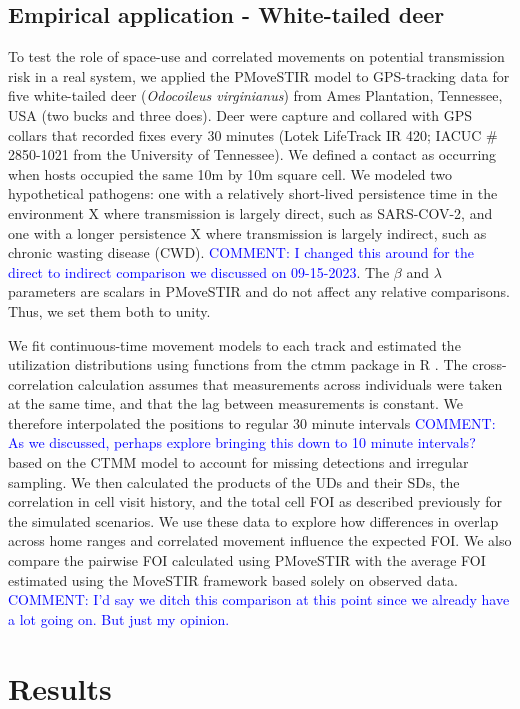 \documentclass[letterpaper]{article}
\begin{document}
\subsection*{Empirical application - White-tailed deer}

To test the role of space-use and correlated movements on potential transmission risk in a real system, we applied the PMoveSTIR model to GPS-tracking data for five white-tailed deer (\emph{Odocoileus virginianus}) from Ames Plantation, Tennessee, USA (two bucks and three does).  Deer were capture and collared with GPS collars that recorded fixes every 30 minutes (Lotek LifeTrack IR 420; IACUC \# 2850-1021 from the University of Tennessee).  We defined a contact as occurring when hosts occupied the same 10m by 10m square cell. We modeled two hypothetical pathogens: one with a relatively short-lived persistence time in the environment X where transmission is largely direct, such as SARS-COV-2, and one with a longer persistence X where transmission is largely indirect, such as chronic wasting disease (CWD). \textcolor{blue}{COMMENT:  I changed this around for the direct to indirect comparison we discussed on 09-15-2023}.  The $\beta$ and $\lambda$ parameters are scalars in PMoveSTIR and do not affect any relative comparisons. Thus, we set them both to unity. 

We fit continuous-time movement models to each track and estimated the utilization distributions using functions from the ctmm package in R \citep{Calabrese2016}. The cross-correlation calculation assumes that measurements across individuals were taken at the same time, and that the lag between measurements is constant. We therefore interpolated the positions to regular 30 minute intervals \textcolor{blue}{COMMENT: As we discussed, perhaps explore bringing this down to 10 minute intervals?} based on the CTMM model to account for missing detections and irregular sampling. 
We then calculated the products of the UDs and their SDs, the correlation in cell visit history, and the total cell FOI as described previously for the simulated scenarios. 
We use these data to explore how differences in overlap across home ranges and  correlated movement influence the expected FOI. 
We also compare the pairwise FOI calculated using PMoveSTIR with the average FOI estimated using the MoveSTIR framework based solely on observed data. \textcolor{blue}{COMMENT: I'd say we ditch this comparison at this point since we already have a lot going on. But just my opinion.} 

\section*{Results}
\end{document}
